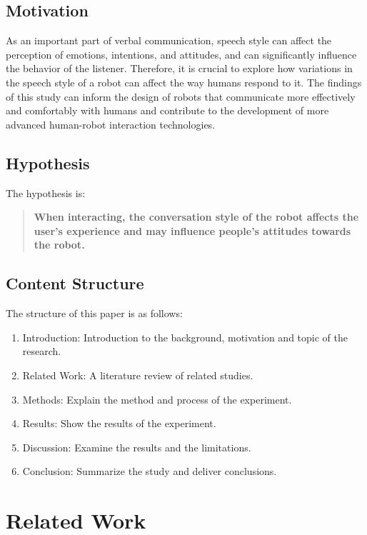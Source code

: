\documentclass[conference]{IEEEtran}
\begin{document}
\subsection{Motivation}

As an important part of verbal communication, speech style can affect the perception of emotions, intentions, and attitudes, and can significantly influence the behavior of the listener. Therefore, it is crucial to explore how variations in the speech style of a robot can affect the way humans respond to it. The findings of this study can inform the design of robots that communicate more effectively and comfortably with humans and contribute to the development of more advanced human-robot interaction technologies.

\subsection{Hypothesis}

The hypothesis is:

\begin{quote}
    \textbf{When interacting, the conversation style of the robot affects the user's experience and may influence people's attitudes towards the robot.}
\end{quote}

\subsection{Content Structure}

The structure of this paper is as follows:
\begin{enumerate}
    \item Introduction: Introduction to the background, motivation and topic of the research.
    \item Related Work: A literature review of related studies.
    \item Methods: Explain the method and process of the experiment.
    \item Results: Show the results of the experiment.
    \item Discussion: Examine the results and the limitations.
    \item Conclusion: Summarize the study and deliver conclusions.
\end{enumerate}

\section{Related Work}
\end{document}
